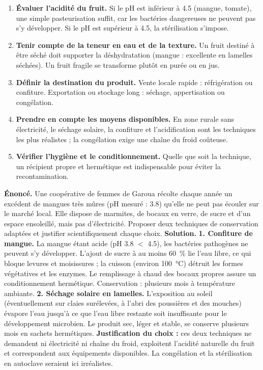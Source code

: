 \documentclass[11pt]{article}
\newcounter{popsec}
\newcounter{popsub}
\newcommand{\courssub}[1]{%
  \stepcounter{popsub}%
  \par\vspace{9pt}\noindent{\popxbold\fontsize{11.5}{13}\selectfont\color{popink}{\color{poporange}\thepopsec.\thepopsub}\hspace{6pt}#1}\par\nopagebreak\vspace{4pt}
}
\begin{document}
\courssub{Comment choisir la bonne technique ?}

\begin{methode}
\begin{enumerate}
\item \textbf{Évaluer l'acidité du fruit.} Si le pH est inférieur à \num{4,5} (mangue, tomate), une simple pasteurisation suffit, car les bactéries dangereuses ne peuvent pas s'y développer. Si le pH est supérieur à \num{4,5}, la stérilisation s'impose.
\item \textbf{Tenir compte de la teneur en eau et de la texture.} Un fruit destiné à être séché doit supporter la déshydratation (mangue : excellente en lamelles séchées). Un fruit fragile se transforme plutôt en purée ou en jus.
\item \textbf{Définir la destination du produit.} Vente locale rapide : réfrigération ou confiture. Exportation ou stockage long : séchage, appertisation ou congélation.
\item \textbf{Prendre en compte les moyens disponibles.} En zone rurale sans électricité, le séchage solaire, la confiture et l'acidification sont les techniques les plus réalistes ; la congélation exige une chaîne du froid coûteuse.
\item \textbf{Vérifier l'hygiène et le conditionnement.} Quelle que soit la technique, un récipient propre et hermétique est indispensable pour éviter la recontamination.
\end{enumerate}
\end{methode}

\begin{exoresolu}
\textbf{Énoncé.} Une coopérative de femmes de Garoua récolte chaque année un excédent de mangues très mûres (pH mesuré : \num{3,8}) qu'elle ne peut pas écouler sur le marché local. Elle dispose de marmites, de bocaux en verre, de sucre et d'un espace ensoleillé, mais pas d'électricité. Proposer deux techniques de conservation adaptées et justifier scientifiquement chaque choix.
\tcblower
\textbf{Solution.} \textbf{1. Confiture de mangue.} La mangue étant acide (pH \num{3,8} $<$ \num{4,5}), les bactéries pathogènes ne peuvent s'y développer. L'ajout de sucre à au moins \SI{60}{\%} lie l'eau libre, ce qui bloque levures et moisissures ; la cuisson (environ \SI{100}{\celsius}) détruit les formes végétatives et les enzymes. Le remplissage à chaud des bocaux propres assure un conditionnement hermétique. Conservation : plusieurs mois à température ambiante. \textbf{2. Séchage solaire en lamelles.} L'exposition au soleil (éventuellement sur claies surélevées, à l'abri des poussières et des mouches) évapore l'eau jusqu'à ce que l'eau libre restante soit insuffisante pour le développement microbien. Le produit sec, léger et stable, se conserve plusieurs mois en sachets hermétiques. \textbf{Justification du choix :} ces deux techniques ne demandent ni électricité ni chaîne du froid, exploitent l'acidité naturelle du fruit et correspondent aux équipements disponibles. La congélation et la stérilisation en autoclave seraient ici irréalistes.
\end{exoresolu}
\end{document}
